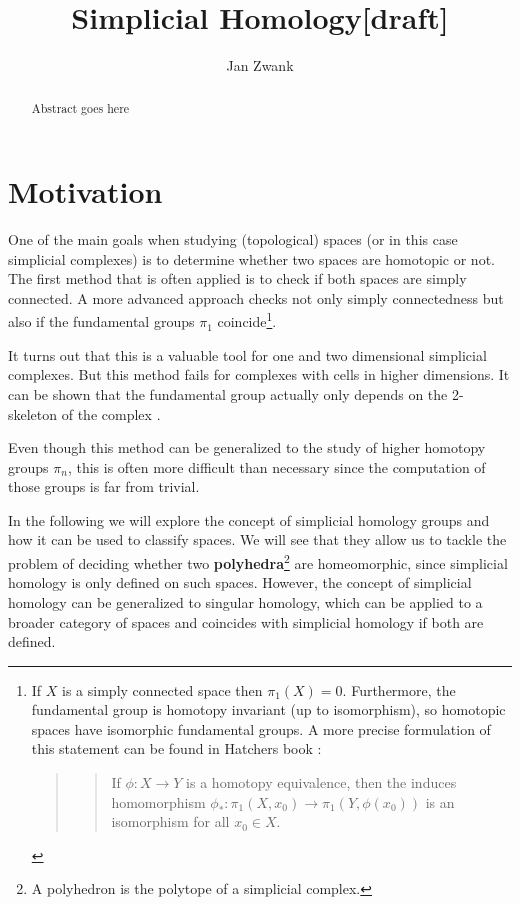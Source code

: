 \documentclass[draft]{scrartcl}
\title{Simplicial Homology[draft]}
\author{Jan Zwank}
\theoremstyle{plain}
\theoremstyle{definition}
\theoremstyle{remark}
\newcommand{\sh}{simplicial homology}
\newcommand{\scs}{simplicial complexes}
\begin{document}
	\maketitle
	
	\begin{abstract}
		Abstract goes here
	\end{abstract}
\tableofcontents

\clearpage

\section{Motivation}\label{motivation}
One of the main goals when studying (topological) spaces (or in this case \scs) is to determine whether two spaces are homotopic
 or not. The first method that is often applied is to check if both spaces are simply connected. A more advanced approach checks not only simply connectedness but also if the fundamental groups $\pi_1$ coincide\footnote{If $X$ is a simply connected space then $\pi_1(X)=0$. Furthermore, the fundamental group is homotopy invariant (up to isomorphism), so homotopic spaces have isomorphic fundamental groups. A more precise formulation of this statement can be found in Hatchers book \parencite[Prop. 1.18, p. 37]{ha}:
\begin{quotation}
	\begin{quote}
		If $\phi: X\to Y$ is a homotopy equivalence, then the induces homomorphism $\phi_*:\pi_1(X,x_0)\to\pi_1(Y,\phi(x_0))$ is an isomorphism for all $x_0\in X$.
	\end{quote}
\end{quotation} }.

It turns out that this is a valuable tool for one and two dimensional \scs. But this method fails for complexes with cells in higher dimensions. It can be shown that the fundamental group actually only depends on the 2-skeleton of the complex \cite[vgl.][p. 173]{ar}. 

Even though this method can be generalized to the study of higher homotopy groups $\pi_n$, this is often more difficult than necessary since the computation of those groups is far from trivial.

In the following we will explore the concept of \sh{} groups and how it can be used to classify spaces. We will see that they allow us to tackle the problem of deciding whether two \textbf{polyhedra}\footnote{A polyhedron is the polytope of a simplicial complex.} are homeomorphic, since simplicial homology is only defined on such spaces. However, the concept of \sh{} can be generalized to singular homology, which can be applied to a broader category of spaces and coincides with \sh{} if both are defined.
\end{document}
